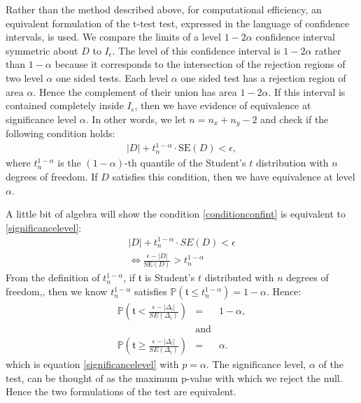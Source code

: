 Rather than the method described above, for computational efficiency, an equivalent formulation of the t-test test, expressed in the language of confidence intervals, is used. We compare the limits of a level $1 - 2 \alpha$ confidence interval symmetric about $D$ to $I_\epsilon$. The level of this confidence interval is $1 - 2 \alpha$ rather than $1 - \alpha$ because it corresponds to the intersection of the rejection regions of two level $\alpha$ one sided tests. Each level $\alpha$ one sided test has a rejection region of area $\alpha$. Hence the complement of their union has area $1- 2 \alpha$. If this interval is contained completely inside $I_\epsilon$, then we have evidence of equivalence at significance level $\alpha$. In other words, we let $n = n_x + n_y -2$ and check if the following condition holds:
\begin{eqnarray} 
\label{conditionconfint}
|D| + t^{1-\alpha}_{n} \cdot \mbox{SE}(D) < \epsilon,
 \end{eqnarray}
where $t^{1-\alpha}_{n}$ is the $(1-\alpha)$-th quantile of the Student's $t$ distribution with $n$ degrees of freedom. If $D$ satisfies this condition, then we have equivalence at level $\alpha$.

A little bit of algebra will show the condition \ref{conditionconfint} is equivalent to \ref{significancelevel}: 
\begin{eqnarray}
|D| + t^{1-\alpha}_{n} \cdot SE(D) < \epsilon \\
\iff \frac{\epsilon - |D|}{\mbox{SE}(D)} > t^{1-\alpha}_{n}
\end{eqnarray}
From the definition of $t^{1-\alpha}_{n}$, if $\mathfrak{t}$ is Student's $t$ distributed with $n$ degrees of freedom,, then we know $t^{1-\alpha}_{n}$ satisfies $\mathbb{P}( \mathfrak{t}  \leq t^{1-\alpha}_{n}) = 1-\alpha$. Hence: 
\begin{eqnarray}
 \mathbb{P}\left(  \mathfrak{t} < \frac{\epsilon - |\Delta_i|}{SE(\Delta_i)} \right) &=& 1 - \alpha, 
 \\ & \mbox{and} & \\
 \mathbb{P}\left(\mathfrak{t} \geq \frac{\epsilon - |\Delta_i|}{SE(\Delta_i)}  \right) &=&  \alpha.
\end{eqnarray} 
which is equation \ref{significancelevel} with $p = \alpha$. The significance level, $\alpha$ of the test, can be thought of as the maximum p-value with which we reject the null. Hence the two formulations of the test are equivalent.






